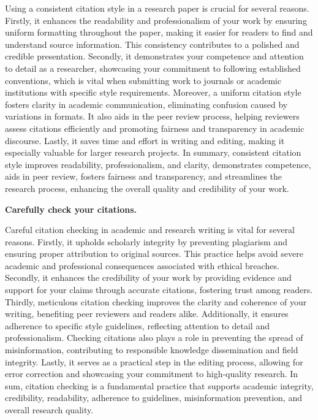 \documentclass[
  b5paper]{book}
\begin{document}
Using a consistent citation style in a research paper is crucial for several reasons. Firstly, it enhances the readability and professionalism of your work by ensuring uniform formatting throughout the paper, making it easier for readers to find and understand source information. This consistency contributes to a polished and credible presentation. Secondly, it demonstrates your competence and attention to detail as a researcher, showcasing your commitment to following established conventions, which is vital when submitting work to journals or academic institutions with specific style requirements. Moreover, a uniform citation style fosters clarity in academic communication, eliminating confusion caused by variations in formats. It also aids in the peer review process, helping reviewers assess citations efficiently and promoting fairness and transparency in academic discourse. Lastly, it saves time and effort in writing and editing, making it especially valuable for larger research projects. In summary, consistent citation style improves readability, professionalism, and clarity, demonstrates competence, aids in peer review, fosters fairness and transparency, and streamlines the research process, enhancing the overall quality and credibility of your work.

\textbf{Carefully check your citations.}

Careful citation checking in academic and research writing is vital for several reasons. Firstly, it upholds scholarly integrity by preventing plagiarism and ensuring proper attribution to original sources. This practice helps avoid severe academic and professional consequences associated with ethical breaches. Secondly, it enhances the credibility of your work by providing evidence and support for your claims through accurate citations, fostering trust among readers. Thirdly, meticulous citation checking improves the clarity and coherence of your writing, benefiting peer reviewers and readers alike. Additionally, it ensures adherence to specific style guidelines, reflecting attention to detail and professionalism. Checking citations also plays a role in preventing the spread of misinformation, contributing to responsible knowledge dissemination and field integrity. Lastly, it serves as a practical step in the editing process, allowing for error correction and showcasing your commitment to high-quality research. In sum, citation checking is a fundamental practice that supports academic integrity, credibility, readability, adherence to guidelines, misinformation prevention, and overall research quality.
\end{document}
